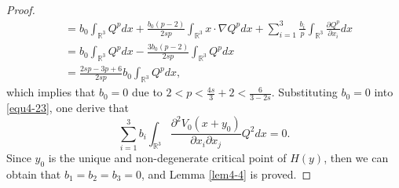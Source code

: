\documentclass[10pt,a4paper]{amsart}
\begin{document}
\begin{proof}
\begin{equation*}
\begin{split}
				&=b_{0}\int_{\mathbb{R}^{3}}Q^{p}dx+\frac{b_{0}(p-2)}{2sp}\int_{\mathbb{R}^{3}}x\cdot\nabla Q^{p}dx+\sum_{i=1}^{3}\frac{b_{i}}{p}\int_{\mathbb{R}^{3}}\frac{\partial Q^{p}}{\partial x_{i}}dx\\
				&=b_{0}\int_{\mathbb{R}^{3}}Q^{p}dx-\frac{3b_{0}(p-2)}{2sp}\int_{\mathbb{R}^{3}}Q^{p}dx\\
				&=\frac{2sp-3p+6}{2sp}b_{0}\int_{\mathbb{R}^{3}}Q^{p}dx,
			\end{split}
		\end{equation*}
		which implies that $b_{0}=0$ due to $2<p<\frac{4s}{3}+2<\frac{6}{3-2s}$. Substituting $b_{0}=0$ into \eqref{equ4-23}, one derive that
		\begin{equation*}
			\sum^{3}_{i=1}
			b_{i}\int_{\mathbb{R}^{3}}\frac{\partial^{2}V_{0}(x+y_{0})}{\partial x_{i}\partial x_{j}}Q^{2}dx=0.
		\end{equation*}
		Since $y_{0}$ is the unique and non-degenerate critical point of
		$H(y)$, then we can obtain that $b_{1}=b_{2}=b_{3}=0$, and Lemma \ref{lem4-4} is proved.
	\end{proof}
\end{document}

